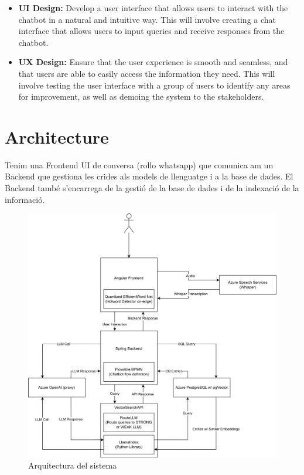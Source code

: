\documentclass[a4paper,12pt,twoside]{ThesisStyle}
\begin{document}
\begin{itemize}
  \item \textbf{UI Design:} Develop a user interface that allows users to interact with the chatbot in a natural and intuitive way. This will involve creating a chat interface that allows users to input queries and receive responses from the chatbot.
  \item \textbf{UX Design:} Ensure that the user experience is smooth and seamless, and that users are able to easily access the information they need. This will involve testing the user interface with a group of users to identify any areas for improvement, as well as demoing the system to the stakeholders.
\end{itemize}


\section{Architecture}

Tenim una Frontend UI de conversa (rollo whatsapp) que comunica am un Backend que gestiona les crides als models de llenguatge i a la base de dades. El Backend també s'encarrega de la gestió de la base de dades i de la indexació de la informació.

\begin{figure}[htb]
  \centering
\includegraphics[width=1\textwidth]{imatges/Full DSO App Architecture.drawio.png}
  \caption{Arquitectura del sistema}
\end{figure}
\end{document}
